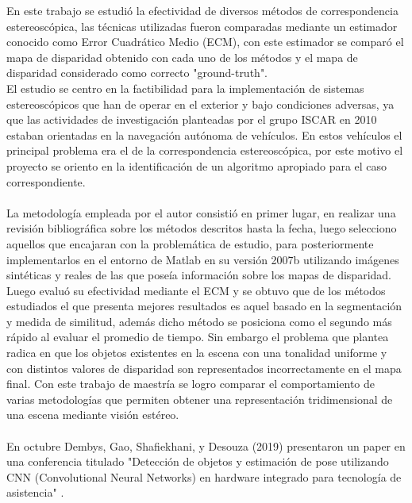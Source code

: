 En este trabajo se estudió la efectividad de diversos métodos de correspondencia estereoscópica, las técnicas utilizadas fueron comparadas mediante un estimador conocido como Error Cuadrático Medio (ECM), con este estimador se comparó el mapa de disparidad obtenido con cada uno de los métodos y el mapa de disparidad considerado como correcto "ground-truth". 
\\
El estudio se centro en la factibilidad para la implementación de sistemas estereoscópicos que han de operar en el exterior y bajo condiciones adversas, ya que las actividades de investigación planteadas por el grupo ISCAR en 2010 estaban orientadas en la navegación autónoma de vehículos. En estos vehículos el principal problema era el de la correspondencia estereoscópica, por este motivo el proyecto se oriento en la identificación de un algoritmo apropiado para el caso correspondiente.
\\
\\
La metodología empleada por el autor consistió en primer lugar, en realizar una revisión bibliográfica sobre los métodos descritos hasta la fecha, luego selecciono aquellos que encajaran con la problemática de estudio, para posteriormente implementarlos en el entorno de Matlab en su versión 2007b utilizando imágenes sintéticas y reales de las que poseía información sobre los mapas de disparidad. Luego evaluó su efectividad mediante el ECM y se obtuvo que de los métodos estudiados el que presenta mejores resultados es aquel basado en la segmentación y medida de similitud, además dicho método  se posiciona como el segundo más rápido al evaluar el promedio de tiempo. Sin embargo el problema que plantea radica en que los objetos existentes en la escena con una tonalidad uniforme y con distintos valores de disparidad son representados incorrectamente en el mapa final. Con este trabajo de maestría se logro comparar el comportamiento de varias metodologías que permiten obtener una representación tridimensional de una escena mediante visión estéreo.
\\
\\
En octubre Dembys, Gao, Shafiekhani, y Desouza (2019) presentaron un paper en una conferencia titulado "Detección de objetos y estimación de pose utilizando CNN (Convolutional Neural Networks) en hardware integrado para tecnología de asistencia" \cite{AssistiveTech}.
\\
\\
